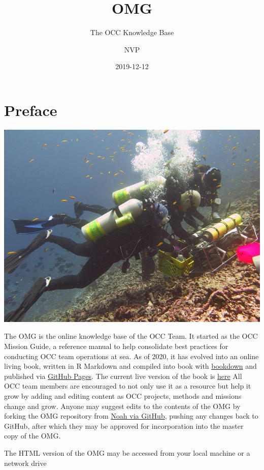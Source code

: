 \documentclass[]{book}
\title{OMG}
\subtitle{The OCC Knowledge Base}
\author{NVP}
\date{2019-12-12}
\begin{document}
\maketitle

{
\setcounter{tocdepth}{1}
\tableofcontents
}
\hypertarget{preface}{%
\chapter*{Preface}\label{preface}}

\includegraphics{images/d_suite_deploy_small.jpg}

The OMG is the online knowledge base of the OCC Team. It started as the OCC Mission Guide, a reference manual to help consolidate best practices for conducting OCC team operations at sea. As of 2020, it has evolved into an online living book, written in R Markdown and compiled into book with \href{https://bookdown.org/yihui/bookdown/}{bookdown} and published via \href{https://pages.github.com/}{GitHub Pages}. The current live version of the book is \href{https://npomeroy.github.io/OMG/}{here} All OCC team members are encouraged to not only use it as a resource but help it grow by adding and editing content as OCC projects, methods and missions change and grow. Anyone may suggest edits to the contents of the OMG by forking the OMG repository from \href{https://github.com/npomeroy/OMG}{Noah via GitHub}, pushing any changes back to GitHub, after which they may be approved for incorporation into the master copy of the OMG.

The HTML version of the OMG may be accessed from your local machine or a network drive
\end{document}
